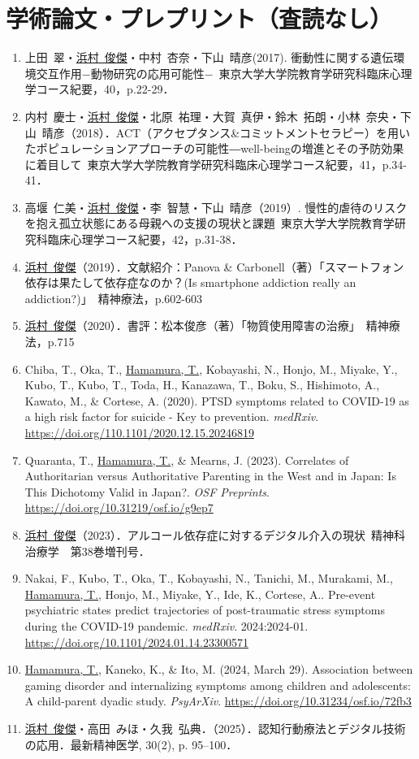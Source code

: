 \documentclass[11pt,a4paper]{article}
\begin{document}
\section{学術論文・プレプリント（査読なし）}
\begin{enumerate}
	\item 上田\ 翠・\underline{浜村\ 俊傑}・中村\ 杏奈・下山\ 晴彦(2017). 衝動性に関する遺伝環境交互作用−動物研究の応用可能性−\ 東京大学大学院教育学研究科臨床心理学コース紀要，40，p.22-29．
	\item 内村\ 慶士・\underline{浜村\ 俊傑}・北原\ 祐理・大賀\ 真伊・鈴木\ 拓朗・小林\ 奈央・下山\ 晴彦（2018）．ACT（アクセプタンス\&コミットメントセラピー）を用いたポピュレーションアプローチの可能性―well-beingの増進とその予防効果に着目して\ 東京大学大学院教育学研究科臨床心理学コース紀要，41，p.34-41．
	\item 高堰\ 仁美・\underline{浜村\ 俊傑}・李\ 智慧・下山\ 晴彦（2019）. 慢性的虐待のリスクを抱え孤立状態にある母親への支援の現状と課題\ 東京大学大学院教育学研究科臨床心理学コース紀要，42，p.31-38．
	\item \underline{浜村\ 俊傑}（2019）．文献紹介：Panova \& Carbonell（著）「スマートフォン依存は果たして依存症なのか？(Is smartphone addiction really an addiction?)」\ 精神療法，p.602-603
	\item \underline{浜村\ 俊傑}（2020）．書評：松本俊彦（著）「物質使用障害の治療」\ 精神療法，p.715
	\item Chiba, T., Oka, T., \underline{Hamamura, T.}, Kobayashi, N., Honjo, M., Miyake, Y., Kubo, T., Kubo, T., Toda, H., Kanazawa, T., Boku, S., Hishimoto, A., Kawato, M., \& Cortese, A. (2020). PTSD symptoms related to COVID-19 as a high risk factor for suicide - Key to prevention. \textit{medRxiv}. \url{https://doi.org/110.1101/2020.12.15.20246819}
	\item Quaranta, T., \underline{Hamamura, T.}, \& Mearns, J. (2023). Correlates of Authoritarian versus Authoritative Parenting in the West and in Japan: Is This Dichotomy Valid in Japan?. \textit{OSF Preprints}. \url{https://doi.org/10.31219/osf.io/g9ep7}
	\item \underline{浜村\ 俊傑}（2023）．アルコール依存症に対するデジタル介入の現状\ 精神科治療学　第38巻増刊号．
	\item Nakai, F., Kubo, T., Oka, T., Kobayashi, N., Tanichi, M., Murakami, M., \underline{Hamamura, T.}, Honjo, M., Miyake, Y., Ide, K., Cortese, A.. Pre-event psychiatric states predict trajectories of post-traumatic stress symptoms during the COVID-19 pandemic. \textit{medRxiv}. 2024:2024-01. \url{https://doi.org/10.1101/2024.01.14.23300571}
	\item \underline{Hamamura, T.}, Kaneko, K., \& Ito, M. (2024, March 29). Association between gaming disorder and internalizing symptoms among children and adolescents: A child-parent dyadic study. \textit{PsyArXiv}. \url{https://doi.org/10.31234/osf.io/72fb3}
		\item \underline{浜村\ 俊傑}・高田\ みほ・久我\ 弘典．（2025）．認知行動療法とデジタル技術の応用．最新精神医学, 30(2), p. 95--100． 
	
\end{enumerate}
\end{document}
